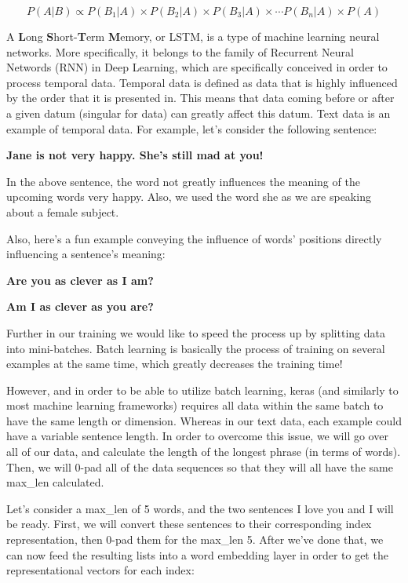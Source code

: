 \documentclass{article}
\begin{document}
\begin{equation}
    P(A|B) \varpropto P(B_1|A) \times P(B_2|A) \times P(B_3|A) \times \cdots P(B_n|A) \times P(A)
\end{equation}

A \textbf{L}ong \textbf{S}hort-\textbf{T}erm \textbf{M}emory, or LSTM, is a type of machine learning neural networks. More specifically, it belongs to the family of Recurrent Neural Networds (RNN) in Deep Learning, which are specifically conceived in order to process temporal data. Temporal data is defined as data that is highly influenced by the order that it is presented in. This means that data coming before or after a given datum (singular for data) can greatly affect this datum. Text data is an example of temporal data. For example, let's consider the following sentence:

\textbf{Jane is not very happy. She's still mad at you!}

In the above sentence, the word not greatly influences the meaning of the upcoming words very happy. Also, we used the word she as we are speaking about a female subject.

Also, here's a fun example conveying the influence of words' positions directly influencing a sentence's meaning:

\textbf{Are you as clever as I am?}

\textbf{Am I as clever as you are?}

Further in our training we would like to speed the process up by splitting data into mini-batches. Batch learning is basically the process of training on several examples at the same time, which greatly decreases the training time!

However, and in order to be able to utilize batch learning, keras (and similarly to most machine learning frameworks) requires all data within the same batch to have the same length or dimension. Whereas in our text data, each example could have a variable sentence length. In order to overcome this issue, we will go over all of our data, and calculate the length of the longest phrase (in terms of words). Then, we will 0-pad all of the data sequences so that they will all have the same max\_len calculated.

Let's consider a max\_len of 5 words, and the two sentences I love you and I will be ready. First, we will convert these sentences to their corresponding index representation, then 0-pad them for the max\_len 5. After we've done that, we can now feed the resulting lists into a word embedding layer in order to get the representational vectors for each index:
\end{document}
